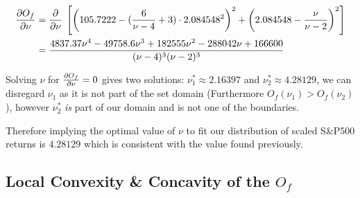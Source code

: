 \begin{align}\label{FirstDerivativeOf_Of_I}
    \begin{split}
        \pdv{O_f}{\nu} &= \pdv{\nu} \; \left[ \left(105.7222 - (\frac{6}{\nu-4} + 3) \cdot
                            2.084548^2 \right)^2 + \left(2.084548 - \frac{\nu}{\nu - 2}\right)^2 \right] \\
                        &= \frac{4837.37 \nu^4 - 49758.6 \nu^3 + 182555 \nu^2 - 288042 \nu + 166600}{(\nu - 4)^3 (\nu - 2)^3}
    \end{split}
\end{align}

Solving $\nu$ for  $\pdv{O_f}{\nu}=0$ gives two solutions: $\nu_1^* \approx 2.16397$ and $\nu_2^* \approx 4.28129$, we can disregard $\nu_1$ as it is not part of the set domain (Furthermore $O_f(\nu_1) > O_f(\nu_2)$), however $\nu_2^*$ \emph{is} part of our domain and is not one of the boundaries. \smallskip
\par
Therefore implying the optimal value of $\nu$ to fit our distribution of scaled S\&P500 returns is $4.28129$ which is consistent with the value found previously.

\subsection{Local Convexity \& Concavity of the $O_f$}


